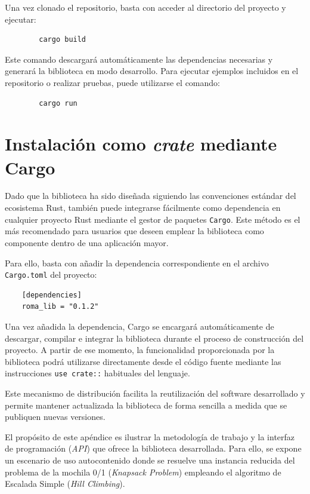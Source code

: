 \documentclass[12pt,a4paper,twoside,openright]{book}
\begin{document}
\begin{umaappendices}
    Una vez clonado el repositorio, basta con acceder al directorio del proyecto y ejecutar:

    \begin{verbatim}
        cargo build
    \end{verbatim}

    Este comando descargará automáticamente las dependencias necesarias y generará la biblioteca en modo desarrollo. Para ejecutar ejemplos incluidos en el repositorio o realizar pruebas, puede utilizarse el comando:

    \begin{verbatim}
        cargo run
    \end{verbatim}

\section{Instalación como \emph{crate} mediante Cargo}
    
    Dado que la biblioteca ha sido diseñada siguiendo las convenciones estándar del ecosistema Rust, también puede integrarse fácilmente como dependencia en cualquier proyecto Rust mediante el gestor de paquetes \texttt{Cargo}. Este método es el más recomendado para usuarios que deseen emplear la biblioteca como componente dentro de una aplicación mayor.
    
    Para ello, basta con añadir la dependencia correspondiente en el archivo \texttt{Cargo.toml} del proyecto:
    
    \begin{verbatim}
    [dependencies]
    roma_lib = "0.1.2"
    \end{verbatim}

    Una vez añadida la dependencia, Cargo se encargará automáticamente de descargar, compilar e integrar la biblioteca durante el proceso de construcción del proyecto. A partir de ese momento, la funcionalidad proporcionada por la biblioteca podrá utilizarse directamente desde el código fuente mediante las instrucciones \texttt{use crate::} habituales del lenguaje.

    Este mecanismo de distribución facilita la reutilización del software desarrollado y permite mantener actualizada la biblioteca de forma sencilla a medida que se publiquen nuevas versiones.

    
El propósito de este apéndice es ilustrar la metodología de trabajo y la interfaz de programación (\textit{API}) que ofrece la biblioteca desarrollada. Para ello, se expone un escenario de uso autocontenido donde se resuelve una instancia reducida del problema de la mochila 0/1 (\textit{Knapsack Problem}) empleando el algoritmo de Escalada Simple (\textit{Hill Climbing}).


\end{umaappendices}
\end{document}
